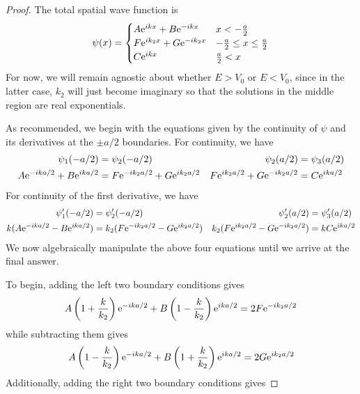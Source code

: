 \documentclass[../psets.tex]{subfiles}
\begin{document}
\begin{enumerate}
\begin{proof}
        The total spatial wave function is
        \begin{equation*}
            \psi(x) =
            \begin{cases}
                A\e[ikx]+B\e[-ikx] & x<-\frac{a}{2}\\
                F\e[ik_2x]+G\e[-ik_2x] & -\frac{a}{2}\leq x\leq\frac{a}{2}\\
                C\e[ikx] & \frac{a}{2}<x
            \end{cases}
        \end{equation*}
        For now, we will remain agnostic about whether $E>V_0$ or $E<V_0$, since in the latter case, $k_2$ will just become imaginary so that the solutions in the middle region are real exponentials.\par
        As recommended, we begin with the equations given by the continuity of $\psi$ and its derivatives at the $\pm a/2$ boundaries. For continuity, we have
        \begin{align*}
            \psi_1(-a/2) &= \psi_2(-a/2)&
                \psi_2(a/2) &= \psi_3(a/2)\\
            A\e[-ika/2]+B\e[ika/2] &= F\e[-ik_2a/2]+G\e[ik_2a/2]&
                F\e[ik_2a/2]+G\e[-ik_2a/2] &= C\e[ika/2]
        \end{align*}
        For continuity of the first derivative, we have
        \begin{align*}
            \psi_1'(-a/2) &= \psi_2'(-a/2)&
                \psi_2'(a/2) &= \psi_3'(a/2)\\
            k(A\e[-ika/2]-B\e[ika/2]) &= k_2(F\e[-ik_2a/2]-G\e[ik_2a/2])&
                k_2(F\e[ik_2a/2]-G\e[-ik_2a/2]) &= kC\e[ika/2]
        \end{align*}
        We now algebraically manipulate the above four equations until we arrive at the final answer.\par
        To begin, adding the left two boundary conditions gives
        \begin{equation*}
            A\left( 1+\frac{k}{k_2} \right)\e[-ika/2]+B\left( 1-\frac{k}{k_2} \right)\e[ika/2] = 2F\e[-ik_2a/2]
        \end{equation*}
        while subtracting them gives
        \begin{equation*}
            A\left( 1-\frac{k}{k_2} \right)\e[-ika/2]+B\left( 1+\frac{k}{k_2} \right)\e[ika/2] = 2G\e[ik_2a/2]
        \end{equation*}
        Additionally, adding the right two boundary conditions gives

\end{proof}
\end{enumerate}
\end{document}

